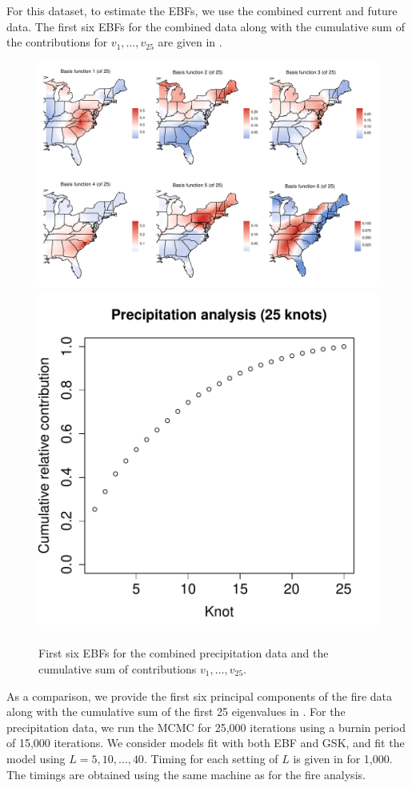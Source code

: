 For this dataset, to estimate the EBFs, we use the combined current and future data.
The first six EBFs for the combined data along with the cumulative sum of the contributions for $v_1, \ldots, v_{25}$ are given in .
\begin{figure}[htbp]  %
  \centering
  \includegraphics[width=\linewidth]{plots/precip-ebf-panel.pdf}\\
  \includegraphics[width=0.35\linewidth]{plots/precipv-25.pdf}
  \caption{First six EBFs for the combined precipitation data and the cumulative sum of contributions $v_1, \ldots, v_{25}$.}
  \label{ebfig:precip-ebfpanel}
\end{figure}
As a comparison, we provide the first six principal components of the fire data along with the cumulative sum of the first 25 eigenvalues in .
For the precipitation data, we run the MCMC for 25,000 iterations using a burnin period of 15,000 iterations.
We consider models fit with both EBF and GSK, and fit the model using $L = 5, 10, \ldots, 40$.
Timing for each setting of $L$ is given in  for 1,000.
The timings are obtained using the same machine as for the fire analysis.


